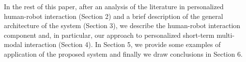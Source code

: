 In the rest of this paper, after an analysis of the literature in personalized human-robot interaction (Section 2) and a brief description of the general architecture of the \coaches system (Section 3), we describe the human-robot interaction component and, in particular, our approach to personalized short-term multi-modal interaction (Section 4). In Section 5, we provide some examples of application of the proposed system and finally we draw conclusions in Section 6.

